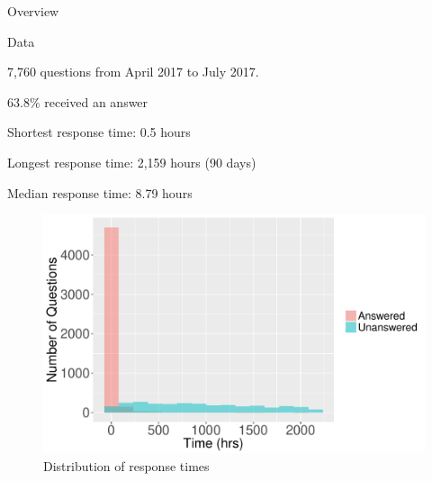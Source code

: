 \documentclass[final]{beamer}
\newlength{\onecolwid}
\begin{document}
\begin{frame}[t]
\begin{columns}[t]
\begin{column}{\onecolwid}
\begin{alertblock}{Overview}
\end{alertblock}


\begin{block}{Data}

\textcolor{dblue!70}{} 7,760 questions from April 2017 to July 2017. 

\vspace{0.5ex}

\textcolor{dblue!70}{} 63.8\% received an answer

\vspace{0.5ex}

\textcolor{dblue!70}{} Shortest response time: 0.5 hours

\vspace{0.5ex}

\textcolor{dblue!70}{} Longest response time: 2,159 hours (90 days)

\vspace{0.5ex}

\textcolor{dblue!70}{} Median response time: 8.79 hours

\end{block}


\begin{figure}
\captionsetup{skip=40pt}
\vspace{4ex}
\includegraphics[width=1\linewidth]{FIG1.pdf}
\caption{Distribution of response times}
\label{fig1}
\end{figure}



\end{column}
\end{columns}
\end{frame}
\end{document}
